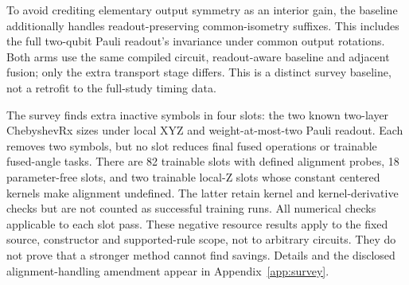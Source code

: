To avoid crediting elementary output symmetry as an interior gain,
the baseline additionally handles readout-preserving common-isometry
suffixes. This includes the full two-qubit Pauli readout's invariance
under common output rotations. Both arms use the same compiled circuit,
readout-aware baseline and adjacent fusion; only the extra transport
stage differs. This is a distinct survey baseline, not a retrofit to
the full-study timing data.

The survey finds extra inactive symbols in four slots: the two known
two-layer ChebyshevRx sizes under local XYZ and weight-at-most-two
Pauli readout. Each removes two symbols, but no slot reduces final
fused operations or trainable fused-angle tasks. There are 82 trainable
slots with defined alignment probes, 18 parameter-free slots, and two
trainable local-Z slots whose constant centered kernels make alignment
undefined. The latter retain kernel and kernel-derivative checks but
are not counted as successful training runs. All numerical checks
applicable to each slot pass. These negative resource results apply to
the fixed source, constructor and supported-rule scope, not to arbitrary
circuits. They do not prove that a stronger method cannot find savings.
Details and the disclosed alignment-handling amendment appear in
Appendix~\ref{app:survey}.
